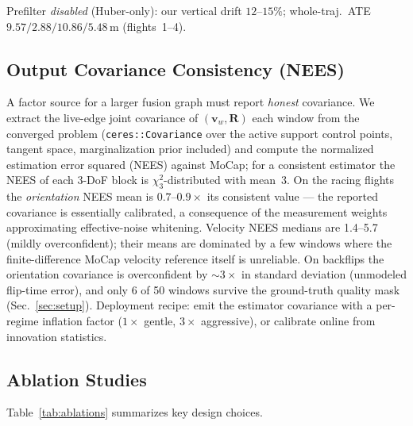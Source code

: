 \documentclass[conference]{IEEEtran}
\newcommand{\vR}{\mathbf{R}}
\newcommand{\vv}{\mathbf{v}}
\begin{document}
\begin{table}[t]
\vspace{5pt}


\vspace{2pt}

\parbox{\dimen0}{\raggedright\footnotesize Prefilter \emph{disabled} (Huber-only): our vertical drift $12$--$15\%$; whole-traj.\ ATE $9.57/2.88/10.86/5.48$\,m (flights~1--4).\par}
\end{table}

\subsection{Output Covariance Consistency (NEES)}
\label{sec:nees}
A factor source for a larger fusion graph must report \emph{honest}
covariance.  We extract the live-edge joint covariance of
$(\vv_w, \vR)$ each window from the converged problem
(\texttt{ceres::Covariance} over the active support control points,
tangent space, marginalization prior included) and compute the
normalized estimation error squared (NEES) against MoCap;
for a consistent estimator the NEES of each 3-DoF block is
$\chi^2_3$-distributed with mean~3.
On the racing flights the \emph{orientation} NEES mean is
$0.7$--$0.9{\times}$ its consistent value --- the reported covariance
is essentially calibrated, a consequence of the measurement weights
approximating effective-noise whitening.  Velocity NEES medians are
1.4--5.7 (mildly overconfident); their means are dominated by a few
windows where the finite-difference MoCap velocity reference itself
is unreliable.  On backflips the orientation covariance is
overconfident by ${\sim}3\times$ in standard deviation (unmodeled
flip-time error), and only 6 of 50 windows survive the ground-truth
quality mask (Sec.~\ref{sec:setup}).  Deployment recipe: emit the
estimator covariance with a per-regime inflation factor
($1\times$ gentle, $3\times$ aggressive), or calibrate online from
innovation statistics.

\subsection{Ablation Studies}
Table~\ref{tab:ablations} summarizes key design choices.
\end{document}
